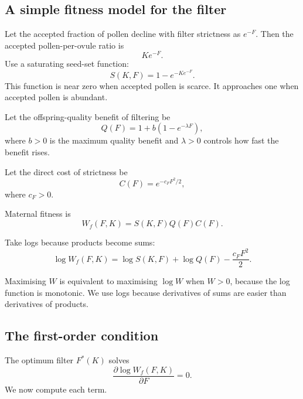 \documentclass[12pt]{article}
\begin{document}
\subsection{A simple fitness model for the filter}

Let the accepted fraction of pollen decline with filter strictness as $e^{-F}$. Then the accepted pollen-per-ovule ratio is
\begin{equation}
Ke^{-F}.
\end{equation}
Use a saturating seed-set function:
\begin{equation}
S(K,F)=1-e^{-Ke^{-F}}.
\label{eq:seedset}
\end{equation}
This function is near zero when accepted pollen is scarce. It approaches one when accepted pollen is abundant.

Let the offspring-quality benefit of filtering be
\begin{equation}
Q(F)=1+b(1-e^{-\lambda F}),
\label{eq:quality}
\end{equation}
where $b>0$ is the maximum quality benefit and $\lambda>0$ controls how fast the benefit rises.

Let the direct cost of strictness be
\begin{equation}
C(F)=e^{-c_FF^2/2},
\label{eq:cost}
\end{equation}
where $c_F>0$.

Maternal fitness is
\begin{equation}
W_f(F,K)=S(K,F)Q(F)C(F).
\label{eq:Wfilter}
\end{equation}

Take logs because products become sums:
\begin{equation}
\log W_f(F,K)=\log S(K,F)+\log Q(F)-\frac{c_FF^2}{2}.
\label{eq:logWfilter}
\end{equation}

\begin{rulebox}
Maximising $W$ is equivalent to maximising $\log W$ when $W>0$, because the log function is monotonic. We use logs because derivatives of sums are easier than derivatives of products.
\end{rulebox}

\subsection{The first-order condition}

The optimum filter $F^*(K)$ solves
\begin{equation}
\frac{\partial \log W_f(F,K)}{\partial F}=0.
\end{equation}
We now compute each term.
\end{document}
